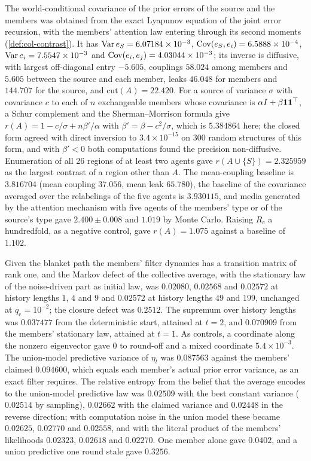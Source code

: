 \begin{numcheck}\label{chk:agy-audience}
The world-conditional covariance of the prior errors of the source and the members was obtained from the exact Lyapunov equation of the joint error recursion, with the members' attention law entering through its second moments (\cref{def:col-contrast}). It has $\operatorname{Var} e_S=6.07184\times10^{-3}$, $\operatorname{Cov}(e_S,e_i)=6.5888\times10^{-4}$, $\operatorname{Var} e_i=7.5547\times10^{-3}$ and $\operatorname{Cov}(e_i,e_j)=4.03044\times10^{-3}$; its inverse is diffusive, with largest off-diagonal entry $-5.605$, couplings $58.024$ among members and $5.605$ between the source and each member, leaks $46.048$ for members and $144.707$ for the source, and $\mathrm{cut}(A)=22.420$. For a source of variance $\sigma$ with covariance $c$ to each of $n$ exchangeable members whose covariance is $\alpha I+\beta\mathbf{1}\mathbf{1}^\top$, a Schur complement and the Sherman--Morrison formula give $r(A)=1-c/\sigma+n\beta'/\alpha$ with $\beta'=\beta-c^2/\sigma$, which is $5.384864$ here; the closed form agreed with direct inversion to $3.4\times10^{-15}$ on 300 random structures of this form, and with $\beta'<0$ both computations found the precision non-diffusive. Enumeration of all 26 regions of at least two agents gave $r(A\cup\{S\})=2.325959$ as the largest contrast of a region other than $A$. The mean-coupling baseline is $3.816704$ (mean coupling $37.056$, mean leak $65.780$), the baseline of the covariance averaged over the relabelings of the five agents is $3.930115$, and media generated by the attention mechanism with five agents of the members' type or of the source's type gave $2.400\pm0.008$ and $1.019$ by Monte Carlo. Raising $R_c$ a hundredfold, as a negative control, gave $r(A)=1.075$ against a baseline of $1.102$.

Given the blanket path the members' filter dynamics has a transition matrix of rank one, and the Markov defect of the collective average, with the stationary law of the noise-driven part as initial law, was $0.02080$, $0.02568$ and $0.02572$ at history lengths $1$, $4$ and $9$ and $0.02572$ at history lengths $49$ and $199$, unchanged at $q_{\mathrm c}=10^{-2}$; the closure defect was $0.2512$. The supremum over history lengths was $0.037477$ from the deterministic start, attained at $t=2$, and $0.070909$ from the members' stationary law, attained at $t=1$. As controls, a coordinate along the nonzero eigenvector gave $0$ to round-off and a mixed coordinate $5.4\times10^{-3}$. The union-model predictive variance of $\eta_t$ was $0.087563$ against the members' claimed $0.094600$, which equals each member's actual prior error variance, as an exact filter requires. The relative entropy from the belief that the average encodes to the union-model predictive law was $0.02509$ with the best constant variance ($0.02514$ by sampling), $0.02662$ with the claimed variance and $0.02448$ in the reverse direction; with computation noise in the union model these became $0.02625$, $0.02770$ and $0.02558$, and with the literal product of the members' likelihoods $0.02323$, $0.02618$ and $0.02270$. One member alone gave $0.0402$, and a union predictive one round stale gave $0.3256$.


\end{numcheck}
